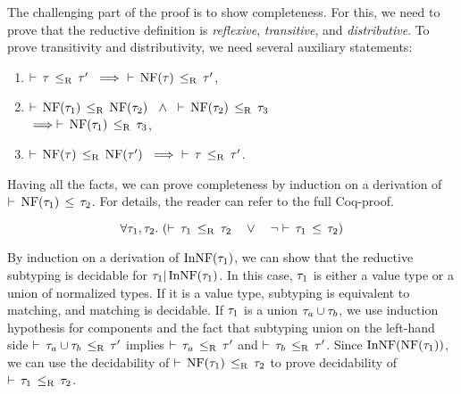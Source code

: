 The challenging part of the proof is to show completeness. 
For this, we need to prove that 
the reductive definition is \emph{reflexive}, \emph{transitive},
and \emph{distributive}.
To prove transitivity and distributivity, 
we need several auxiliary statements:
\begin{enumerate}
  \item $\bjsubr{\ty}{\ty'}\ \implies\ \bjsubr{\NF(\ty)}{\ty'}$,
  \item $\bjsubr{\NF(\ty_1)}{\NF(\ty_2)}\;\;\ \land\;\; \bjsubr{\NF(\ty_2)}{\ty_3}$\\
     $\implies \vdash \, \mathop{\mathrm{NF}}(\tau_1) \, \leq_\mathrm{R} \, \tau_3$,
  \item $\bjsubr{\NF(\ty)}{\NF(\ty')}\ \implies\ \bjsubr{\ty}{\ty'}$.
\end{enumerate}
Having all the facts, we can prove completeness by induction
on a derivation of $\vdash \, \mathop{\mathrm{NF}}(\tau_1) \, \leq \, \tau_2$.
For details, the reader can refer to the full Coq-proof.

\begin{theorem}\label{thm:redsub-decidable}
\[
\forall \ty_1, \ty_2.\ 
(\bjsubr{\ty_1}{\ty_2}\quad \lor\quad \lnot \bjsub{\ty_1}{\ty_2})
\]
\end{theorem}

By induction on a derivation of $\mathop{\mathrm{InNF}}(\tau_1)$, we can show
that the reductive subtyping is decidable for $\tau_1 | \mathop{\mathrm{InNF}}(\tau_1)$.
In this case, $\tau_1$ is either a value type or a union of normalized types.
If it is a value type, subtyping is equivalent to matching,
and matching is decidable.
If $\tau_1$ is a union $\tau_a \cup \tau_b$, 
we use induction hypothesis for components and the fact that
subtyping union on the left-hand side
$\vdash \, \tau_a \cup \tau_b \, \leq_\mathrm{R} \, \tau'$ implies $\vdash \, \tau_a \, \leq_\mathrm{R} \, \tau'$
and $\vdash \, \tau_b \, \leq_\mathrm{R} \, \tau'$.
Since $\mathop{\mathrm{InNF}}(\mathop{\mathrm{NF}}(\tau_1))$, we can use the decidability 
of $\vdash \, \mathop{\mathrm{NF}}(\tau_1) \, \leq_\mathrm{R} \, \tau_2$ to prove decidability
of $\vdash \, \tau_1 \, \leq_\mathrm{R} \, \tau_2$.